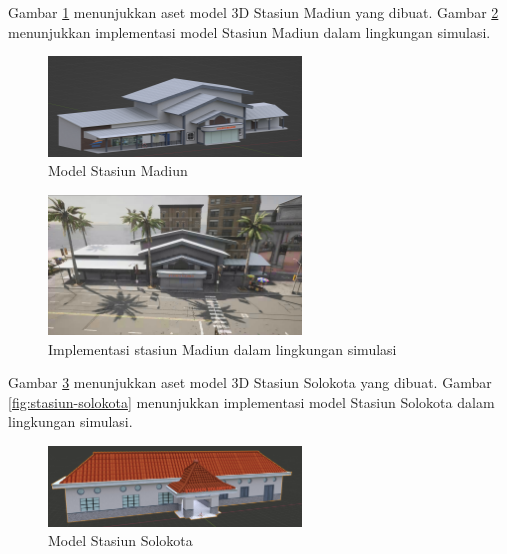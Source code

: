 Gambar \ref{fig:stasiun-madiun-model} menunjukkan aset model 3D Stasiun Madiun
yang dibuat. Gambar \ref{fig:stasiun-madiun} menunjukkan implementasi model
Stasiun Madiun dalam lingkungan simulasi.

\begin{figure}[!h]
    \centering
    \includegraphics[width=0.6\textwidth]{resources/chapter-3-stasiun-madiun-model.png}
    \caption{Model Stasiun Madiun}
    \label{fig:stasiun-madiun-model}
\end{figure}

\begin{figure}[!h]
    \centering
    \includegraphics[width=0.6\textwidth]{resources/chapter-4/stasiun-madiun-carla.png}
    \caption{Implementasi stasiun Madiun dalam lingkungan simulasi}
    \label{fig:stasiun-madiun}
\end{figure}

Gambar \ref{fig:stasiun-solokota-model} menunjukkan aset model 3D Stasiun
Solokota yang dibuat. Gambar \ref{fig:stasiun-solokota} menunjukkan implementasi
model Stasiun Solokota dalam lingkungan simulasi.

\begin{figure}[!h]
    \centering
    \includegraphics[width=0.6\textwidth]{resources/chapter-3-stasiun-solokota-model.png}
    \caption{Model Stasiun Solokota}
    \label{fig:stasiun-solokota-model}
\end{figure}

